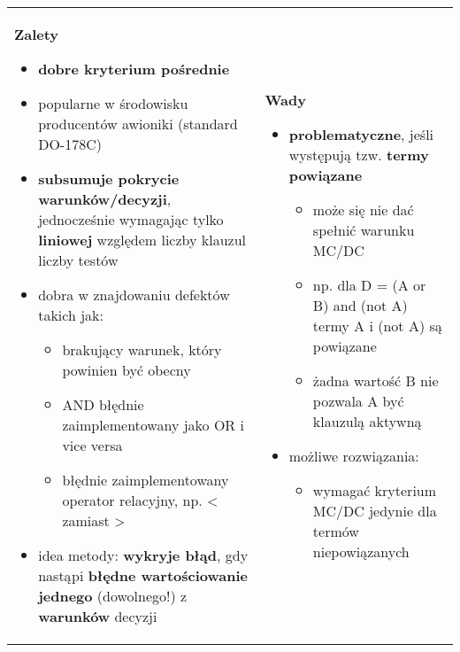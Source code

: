 \documentclass[../main.tex]{subfiles}
\begin{document}
    \begin{table}[H]
        \begin{center}
            \begin{tabular}{p{8cm} p{8cm}}
                \textbf{Zalety}
                \begin{itemize}
                    \item \textbf{dobre kryterium pośrednie}
                    \item popularne w środowisku producentów awioniki (standard DO-178C)
                    \item \textbf{subsumuje pokrycie warunków/decyzji}, jednocześnie
                    wymagając tylko \textbf{liniowej} względem liczby klauzul liczby testów
                    \item dobra w znajdowaniu defektów takich jak:
                    \begin{itemize}
                        \item brakujący warunek, który powinien być obecny
                        \item AND błędnie zaimplementowany jako OR i vice versa
                        \item błędnie zaimplementowany operator relacyjny, np. < zamiast >
                    \end{itemize}
                    \item idea metody: \textbf{wykryje błąd}, gdy nastąpi \textbf{błędne wartościowanie jednego} (dowolnego!) z \textbf{warunków }decyzji
                \end{itemize}
                &
                \textbf{Wady}
                \begin{itemize}
                    \item \textbf{problematyczne}, jeśli występują tzw. \textbf{termy powiązane}
                    \begin{itemize}
                        \item może się nie dać spełnić warunku MC/DC
                        \item np. dla D = (A or B) and (not A) termy A i (not A) są powiązane
                        \item żadna wartość B nie pozwala A być klauzulą aktywną
                    \end{itemize}
                    \item możliwe rozwiązania:
                    \begin{itemize}
                        \item wymagać kryterium MC/DC jedynie dla termów niepowiązanych

\end{itemize}
\end{itemize}
\end{tabular}
\end{center}
\end{table}
\end{document}
